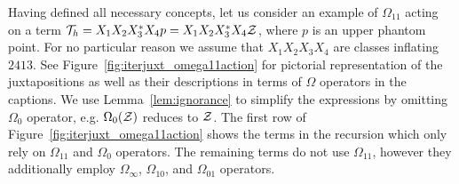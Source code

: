 \documentclass[12pt, a4paper, twoside]{report}
\begin{document}
Having defined all necessary concepts, let us consider an example of $\Omega_{11}$ acting on a term $\mathcal{T}_h = X_1X_2X_3^*X_4p = X_1X_2X_3^*X_4\mathcal{Z}$, where $p$ is an upper phantom point. For no particular reason we assume that $X_1X_2X_3X_4$ are classes inflating $2413$. See Figure~\ref{fig:iterjuxt_omega11action} for pictorial representation of the juxtapositions as well as their descriptions in terms of $\Omega$ operators in the captions. We use Lemma~\ref{lem:ignorance} to simplify the expressions by omitting $\Omega_0$ operator, e.g. $\Omega_0(\mathcal{Z})$ reduces to $\mathcal{Z}$. The first row of Figure~\ref{fig:iterjuxt_omega11action} shows the terms in the recursion which only rely on $\Omega_{11}$ and $\Omega_0$ operators. The remaining terms do not use $\Omega_{11}$, however they additionally employ $\Omega_\infty$, $\Omega_{10}$, and $\Omega_{01}$ operators.
\end{document}
